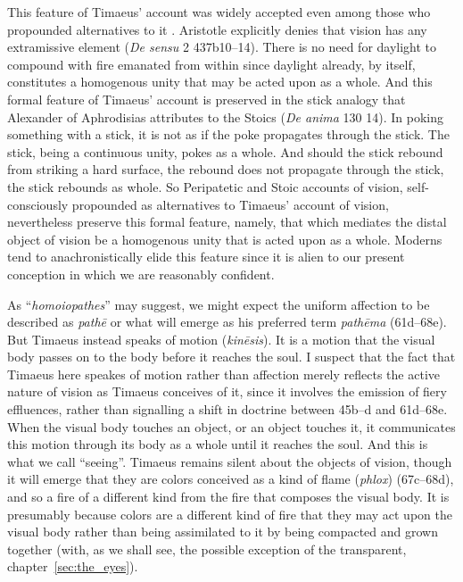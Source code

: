 This feature of Timaeus' account was widely accepted even among those who propounded alternatives to it \cite[chapter 1]{Lindberg:1977aa}. Aristotle explicitly denies that vision has any extramissive element (\emph{De sensu} 2 437b10--14). There is no need for daylight to compound with fire emanated from within since daylight already, by itself, constitutes a homogenous unity that may be acted upon as a whole. And this formal feature of Timaeus' account is preserved in the stick analogy that Alexander of Aphrodisias attributes to the Stoics (\emph{De anima} 130 14). In poking something with a stick, it is not as if the poke propagates through the stick. The stick, being a continuous unity, pokes as a whole. And should the stick rebound from striking a hard surface, the rebound does not propagate through the stick, the stick rebounds as whole. So Peripatetic and Stoic accounts of vision, self-consciously propounded as alternatives to Timaeus' account of vision, nevertheless preserve this formal feature, namely, that which mediates the distal object of vision be a homogenous unity that is acted upon as a whole. Moderns tend to anachronistically elide this feature since it is alien to our present conception in which we are reasonably confident.

As ``\emph{homoiopathes}'' may suggest, we might expect the uniform affection to be described as \emph{pathē} or what will emerge as his preferred term \emph{pathēma} (61d--68e). But Timae\-us instead speaks of motion (\emph{kinēsis}). It is a motion that the visual body passes on to the body before it reaches the soul. I suspect that the fact that Timaeus here speakes of motion rather than affection merely reflects the active nature of vision as Timaeus conceives of it, since it involves the emission of fiery effluences, rather than signalling a shift in doctrine between 45b--d and 61d--68e. When the visual body touches an object, or an object touches it, it communicates this motion through its body as a whole until it reaches the soul. And this is what we call ``seeing''. Timaeus remains silent about the objects of vision, though it will emerge that they are colors conceived as a kind of flame (\emph{phlox}) (67c–68d), and so a fire of a different kind from the fire that composes the visual body. It is presumably because colors are a different kind of fire that they may act upon the visual body rather than being assimilated to it by being compacted and grown together (with, as we shall see, the possible exception of the transparent, chapter~\ref{sec:the_eyes}).

